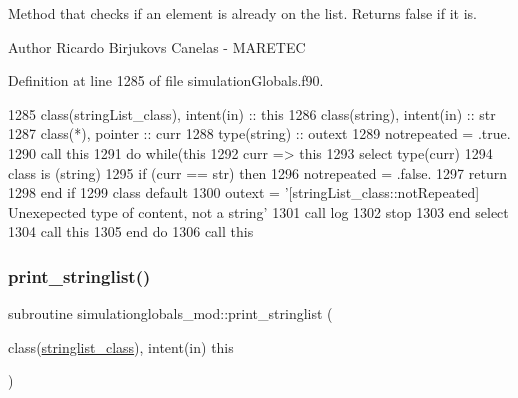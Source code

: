 Method that checks if an element is already on the list. Returns false if it is. 

\begin{DoxyAuthor}{Author}
Ricardo Birjukovs Canelas -\/ M\+A\+R\+E\+T\+EC 
\end{DoxyAuthor}


Definition at line 1285 of file simulation\+Globals.\+f90.


\begin{DoxyCode}
1285     \textcolor{keywordtype}{class}(stringList\_class), \textcolor{keywordtype}{intent(in)} :: this
1286     \textcolor{keywordtype}{class}(string), \textcolor{keywordtype}{intent(in)} :: str
1287     \textcolor{keywordtype}{class}(*), \textcolor{keywordtype}{pointer} :: curr
1288     \textcolor{keywordtype}{type}(string) :: outext
1289     notrepeated = .true.
1290     \textcolor{keyword}{call }this%
1291     \textcolor{keywordflow}{do} \textcolor{keywordflow}{while}(this%
1292         curr => this%
1293         \textcolor{keywordflow}{select type}(curr)
1294 \textcolor{keywordflow}{        class is} (string)
1295             \textcolor{keywordflow}{if} (curr == str) \textcolor{keywordflow}{then}
1296                 notrepeated = .false.
1297                 \textcolor{keywordflow}{return}
1298 \textcolor{keywordflow}{            end if}
1299 \textcolor{keywordflow}{            class default}
1300             outext = \textcolor{stringliteral}{'[stringList\_class::notRepeated] Unexepected type of content, not a string'}
1301             \textcolor{keyword}{call }log%
1302             stop
1303 \textcolor{keywordflow}{        end select}
1304         \textcolor{keyword}{call }this%
1305 \textcolor{keywordflow}{    end do}
1306     \textcolor{keyword}{call }this%
\end{DoxyCode}
\mbox{\label{namespacesimulationglobals__mod_a7adb33aaa9ea0a94c38789c07ff3e787}} 
\subsubsection{\texorpdfstring{print\+\_\+stringlist()}{print\_stringlist()}}
{\footnotesize\ttfamily subroutine simulationglobals\+\_\+mod\+::print\+\_\+stringlist (\begin{DoxyParamCaption}\item[{class(\mbox{\hyperlink{structsimulationglobals__mod_1_1stringlist__class}{stringlist\+\_\+class}}), intent(in)}]{this }\end{DoxyParamCaption})\hspace{0.3cm}{\ttfamily [private]}}



